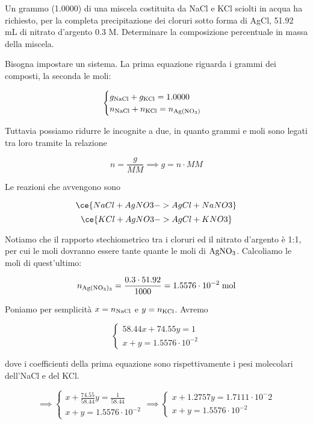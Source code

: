 \begin{esercizio}
    Un grammo (1.0000) di una miscela costituita da NaCl e KCl sciolti in acqua ha richiesto, per la completa precipitazione dei cloruri sotto forma di AgCl, 51.92 mL di nitrato d'argento 0.3 M. Determinare la composizione percentuale in massa della miscela.
\end{esercizio}
\begin{soluzione}
    Bisogna impostare un sistema. La prima equazione riguarda i grammi dei composti, la seconda le moli:

$$\begin{cases}
    g_{\rm NaCl} + g_{\rm KCl}=1.0000\\
    n_{\rm NaCl} + n_{\rm KCl}=n_{\rm Ag(NO_3)}
\end{cases}$$

Tuttavia possiamo ridurre le incognite a due, in quanto grammi e moli sono legati tra loro tramite la relazione

$$n=\frac{g}{MM}
\implies
g=n \cdot MM$$

Le reazioni che avvengono sono

$$\ce{NaCl + AgNO3 -> AgCl + NaNO3}$$
$$\ce{KCl + AgNO3 -> AgCl + KNO3}$$

Notiamo che il rapporto stechiometrico tra i cloruri ed il nitrato d'argento è 1:1, per cui le moli dovranno essere tante quante le moli di $\rm AgNO_3$. Calcoliamo le moli di quest'ultimo:

$$n_{\rm Ag(NO_3)_3}=\frac{0.3 \cdot 51.92}{1000}=1.5576 \cdot 10^{-2} \; \rm mol$$

Poniamo per semplicità $x=n_{\rm NaCl}$ e $y=n_{\rm KCl}$. Avremo

$$\begin{cases}
    58.44x + 74.55y=1\\
    x+y=1.5576 \cdot 10^{-2}
\end{cases}$$

dove i coefficienti della prima equazione sono rispettivamente i pesi molecolari dell'NaCl e del KCl.

$$\implies
\begin{cases}
    x + \displaystyle \frac{74.55}{58.44}y=\displaystyle \frac{1}{58.44}\\[0.2cm]
    x+y=1.5576 \cdot 10^{-2}
\end{cases}
\implies
\begin{cases}
    x + 1.2757y=1.7111 \cdot 10^-2\\
    x+y=1.5576 \cdot 10^{-2}
\end{cases}$$


\end{soluzione}
